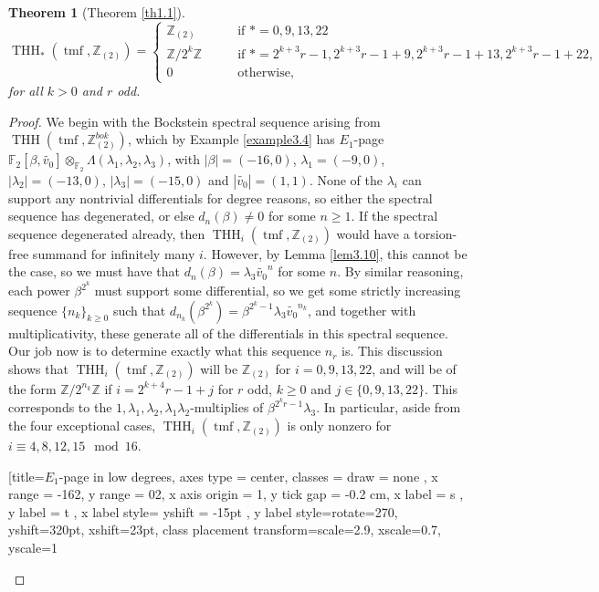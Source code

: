 \documentclass[11pt,leqno]{article}
\newcommand{\zz}{\mathbb{Z}}
\newcommand{\fff}{\mathbb{F}}
\DeclareMathOperator{\THH}{THH}
\DeclareMathOperator{\tmf}{tmf}
\newtheorem*{short hand}{theorem name}
\theoremstyle{plain}  %
\newtheorem{theorem}{Theorem}[section]
\theoremstyle{definition}
\numberwithin{equation}{section}
\begin{document}
\begin{theorem}[Theorem \ref{th1.1}]\label{th3.14}
	$$\THH_*(\tmf,\zz_{(2)})=\begin{cases}
		\zz_{(2)} & \qquad \text{if } *=0,9,13,22\\
		\zz/2^k\zz & \qquad \text{if } *=2^{k+3}r-1, 2^{k+3}r-1+9, 2^{k+3}r-1+13, 2^{k+3}r-1+22,\\
		0 & \qquad \text{otherwise},
	\end{cases}$$
for all $k>0$ and $r$ odd.
\end{theorem}
\begin{proof}
We begin with the Bockstein spectral sequence arising from $\THH(\tmf,\zz_{(2)}^{bok})$, which by Example \ref{example3.4} has $E_1$-page $\fff_2[\beta,\tilde{v_0}]\otimes_{\fff_2}\Lambda(\lambda_1,\lambda_2,\lambda_3)$, with $|\beta|=(-16,0)$, $\lambda_1=(-9,0)$, $|\lambda_2|=(-13,0)$, $|\lambda_3|=(-15,0)$ and $|\tilde{v_0}|=(1,1)$.  None of the $\lambda_i$ can support any nontrivial differentials for degree reasons, so either the spectral sequence has degenerated, or else $d_n(\beta)\neq 0$ for some $n\geq 1$.  If the spectral sequence degenerated already, then $\THH_i(\tmf,\zz_{(2)})$ would have a torsion-free summand for infinitely many $i$.  However, by Lemma \ref{lem3.10}, this cannot be the case, so we must have that $d_n(\beta)=\lambda_3\tilde{v_0}^n$ for some $n$.  By similar reasoning, each power $\beta^{2^k}$ must support some differential, so we get some strictly increasing sequence $\{n_k\}_{k\geq 0}$ such that $d_{n_{k}}(\beta^{2^{k}})=\beta^{2^{k}-1}\lambda_3\tilde{v_0}^{n_k}$, and together with multiplicativity, these generate all of the differentials in this spectral sequence.  Our job now is to determine exactly what this sequence $n_r$ is.  This discussion shows that $\THH_i(\tmf,\zz_{(2)})$ will be $\zz_{(2)}$ for $i=0,9,13,22$, and will be of the form $\zz/2^{n_k}\zz$ if $i=2^{k+4}r-1+j$ for $r$ odd, $k\geq 0$ and $j\in\{0,9,13,22\}$.  This corresponds to the $1,\lambda_1,\lambda_2,\lambda_1\lambda_2$-multiplies of $\beta^{2^kr-1}\lambda_3$.  In particular, aside from the four exceptional cases, $\THH_i(\tmf,\zz_{(2)})$ is only nonzero for $i\equiv 4,8,12,15 \mod 16$.
\begin{center}
	\begin{sseqpage}[title={$E_1$-page in low degrees}, axes type = center,  classes = {draw = none },
		x range = {-16}{2}, y range = {0}{2}, x axis origin = {1}, y tick gap = {-0.2 cm}, x label = { s }, y label = { t }, x label style={ yshift = -15pt }, y label style={rotate=270, yshift=320pt, xshift=23pt}, class placement transform={scale=2.9}, xscale=0.7, yscale=1

\end{sseqpage}
\end{center}
\end{proof}
\end{document}
